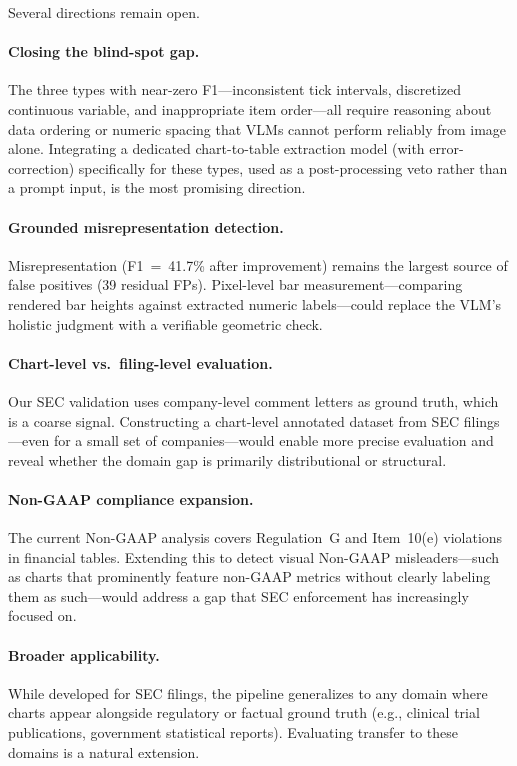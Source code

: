 Several directions remain open.

\paragraph{Closing the blind-spot gap.}
The three types with near-zero F1---inconsistent tick intervals, discretized continuous variable, and inappropriate item order---all require reasoning about data ordering or numeric spacing that VLMs cannot perform reliably from image alone. Integrating a dedicated chart-to-table extraction model (with error-correction) specifically for these types, used as a post-processing veto rather than a prompt input, is the most promising direction.

\paragraph{Grounded misrepresentation detection.}
Misrepresentation (F1~=~41.7\% after improvement) remains the largest source of false positives (39 residual FPs). Pixel-level bar measurement---comparing rendered bar heights against extracted numeric labels---could replace the VLM's holistic judgment with a verifiable geometric check.

\paragraph{Chart-level vs.\ filing-level evaluation.}
Our SEC validation uses company-level comment letters as ground truth, which is a coarse signal. Constructing a chart-level annotated dataset from SEC filings---even for a small set of companies---would enable more precise evaluation and reveal whether the domain gap is primarily distributional or structural.

\paragraph{Non-GAAP compliance expansion.}
The current Non-GAAP analysis covers Regulation~G and Item~10(e) violations in financial tables. Extending this to detect visual Non-GAAP misleaders---such as charts that prominently feature non-GAAP metrics without clearly labeling them as such---would address a gap that SEC enforcement has increasingly focused on.

\paragraph{Broader applicability.}
While developed for SEC filings, the pipeline generalizes to any domain where charts appear alongside regulatory or factual ground truth (e.g., clinical trial publications, government statistical reports). Evaluating transfer to these domains is a natural extension.
